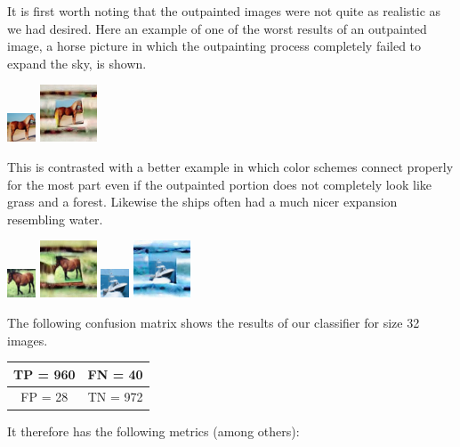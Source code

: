 \documentclass[conference]{IEEEtran}
\begin{document}
It is first worth noting that the outpainted images were not quite as realistic as we had desired. Here an example of one of the worst results of an outpainted image, a horse picture in which the outpainting process completely failed to expand the sky, is shown.

\includegraphics{h132.png}
\includegraphics{h164.png}

This is contrasted with a better example in which color schemes connect properly for the most part even if the outpainted portion does not completely look like grass and a forest. Likewise the ships often had a much nicer expansion resembling water.

\includegraphics{h032.png}
\includegraphics{h064.png}
\includegraphics{s032.png}
\includegraphics{s064.png}

The following confusion matrix shows the results of our classifier for size 32 images.

\begin{center}
\begin{tabular}{|c|c|}
  \hline
  TP = 960 & FN = 40 \\
  \hline
  FP = 28 & TN = 972 \\
  \hline
\end{tabular}
\end{center}

It therefore has the following metrics (among others):
\end{document}
